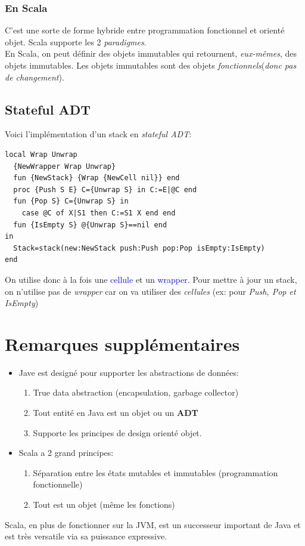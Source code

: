 \documentclass{report}
\begin{document}
\subsubsection{En Scala}
C'est une sorte de forme hybride entre programmation fonctionnel et orienté objet. Scala supporte les 2 \textit{paradigmes}.\\
En Scala, on peut définir des objets immutables qui retournent, \textit{eux-mêmes}, des objets immutables.  Les objets immutables sont des objets \textit{fonctionnels}(\textit{donc pas de changement}).

\subsection{Stateful ADT}
Voici l'implémentation d'un stack en \textit{stateful ADT}:
\begin{lstlisting}[escapechar=\%]
local Wrap Unwrap 
  {NewWrapper Wrap Unwrap} 
  fun {NewStack} {Wrap {NewCell nil}} end 
  proc {Push S E} C={Unwrap S} in C:=E|@C end 
  fun {Pop S} C={Unwrap S} in 
    case @C of X|S1 then C:=S1 X end end 
  fun {IsEmpty S} @{Unwrap S}==nil end
in 
  Stack=stack(new:NewStack push:Push pop:Pop isEmpty:IsEmpty)
end
\end{lstlisting}
On utilise donc à la fois une \textcolor{blue}{cellule} et un \textcolor{blue}{wrapper}. Pour mettre à jour un stack, on n'utilise pas de \textit{wrapper} car on va utiliser des \textit{cellules} (ex: pour \textit{Push, Pop et IsEmpty})

\section{Remarques supplémentaires}
\begin{itemize}
\item Jave est designé pour supporter les abstractions de données:
	\begin{enumerate}
	\item True data abstraction (encapsulation, garbage collector)
	\item Tout entité en Java est un objet ou un \textbf{ADT}
	\item Supporte les principes de design orienté objet.
	\end{enumerate}
\item Scala a 2 grand principes:
	\begin{enumerate}
	\item Séparation entre les états mutables et immutables (programmation fonctionnelle)
	\item Tout est un objet (même les fonctions)
	\end{enumerate}
\end{itemize}
Scala, en plus de fonctionner sur la JVM, est un successeur important de Java et est très versatile via sa puissance expressive.
\end{document}
